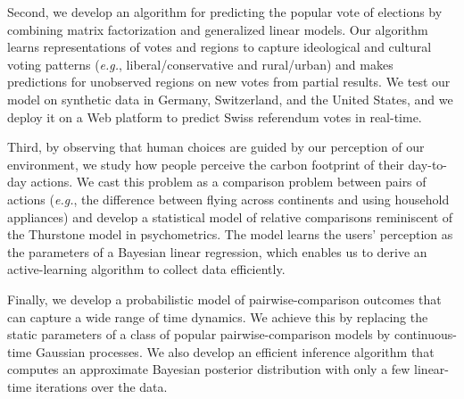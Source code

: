 
Second, we develop an algorithm for predicting the popular vote of elections by combining matrix factorization and generalized linear models.
Our algorithm learns representations of votes and regions to capture ideological and cultural voting patterns (\textit{e.g.}, liberal/conservative and rural/urban) and makes predictions for unobserved regions on new votes from partial results.
We test our model on synthetic data in Germany, Switzerland, and the United States, and we deploy it on a Web platform to predict Swiss referendum votes in real-time.

Third, by observing that human choices are guided by our perception of our environment, we study how people perceive the carbon footprint of their day-to-day actions.
We cast this problem as a comparison problem between pairs of actions (\textit{e.g.}, the difference between flying across continents and using household appliances) and develop a statistical model of relative comparisons reminiscent of the Thurstone model in psychometrics.
The model learns the users’ perception as the parameters of a Bayesian linear regression, which enables us to derive an active-learning algorithm to collect data efficiently.

Finally, we develop a probabilistic model of pairwise-comparison outcomes that can capture a wide range of time dynamics.
We achieve this by replacing the static parameters of a class of popular pairwise-comparison models by continuous-time Gaussian processes.
We also develop an efficient inference algorithm that computes an approximate Bayesian posterior distribution with only a few linear-time iterations over the data.

